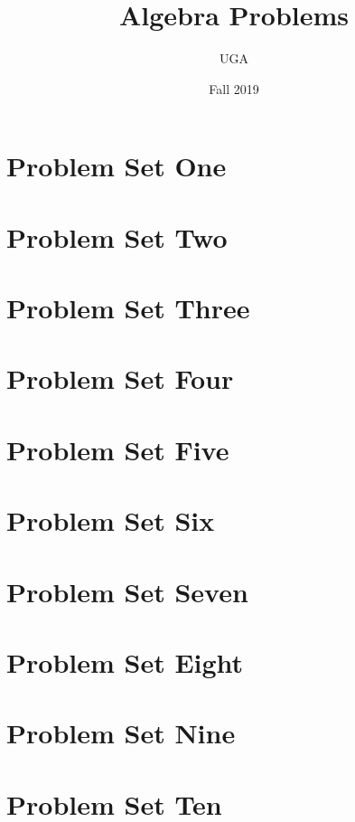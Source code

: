 

\title{Algebra Problems}
\author{UGA}
\date{Fall 2019}



\maketitle

\tableofcontents
\newpage

\section{Problem Set One}

\newpage

% 

\section{Problem Set Two}

\newpage

\section{Problem Set Three}

\newpage

\section{Problem Set Four}

\newpage

\section{Problem Set Five}

\newpage

\section{Problem Set Six}

\newpage

\section{Problem Set Seven}

\newpage

\section{Problem Set Eight}

\newpage

\section{Problem Set Nine}

\newpage

\section{Problem Set Ten}

\newpage

